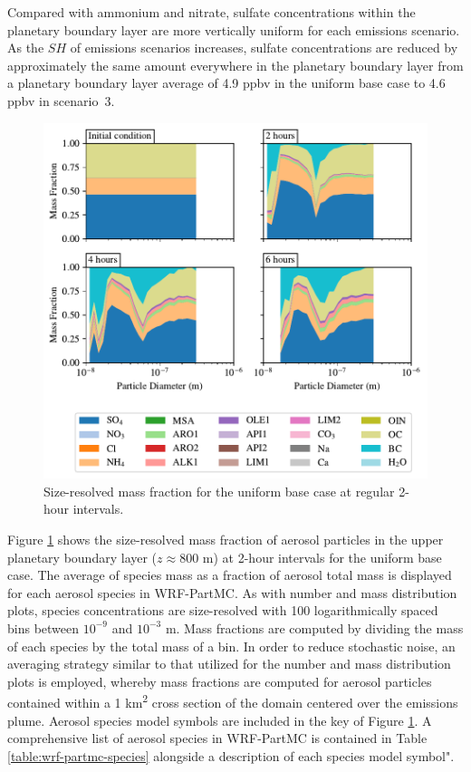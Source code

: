 Compared with ammonium and nitrate, sulfate concentrations within the planetary boundary layer are more vertically uniform for each emissions scenario. As the $SH$ of emissions scenarios increases, sulfate concentrations are reduced by approximately the same amount everywhere in the planetary boundary layer from a planetary boundary layer average of 4.9 ppbv in the uniform base case to 4.6 ppbv in scenario~3. 

\begin{figure}[!t]
  \centering
    \includegraphics[width=\textwidth]{figures/chapter5/speciated-mass-frac-four-panel-uniform-basecase-z40.pdf}
    \caption{Size-resolved mass fraction for the uniform base case at regular 2-hour intervals.}
    \label{fig:mass-frac-ub}
\end{figure}

Figure \ref{fig:mass-frac-ub} shows the size-resolved mass fraction of aerosol particles in the upper planetary boundary layer ($z\approx800$ m) at 2-hour intervals for the uniform base case. The average of species mass as a fraction of aerosol total mass is displayed for each aerosol species in WRF-PartMC. As with number and mass distribution plots, species concentrations are size-resolved with 100 logarithmically spaced bins between $10^{-9}$ and $10^{-3}$ m. Mass fractions are computed by dividing the mass of each species by the total mass of a bin. In order to reduce stochastic noise, an averaging strategy similar to that utilized for the number and mass distribution plots is employed, whereby mass fractions are computed for aerosol particles contained within a 1 \si{km^2} cross section of the domain centered over the emissions plume. Aerosol species model symbols are included in the key of Figure \ref{fig:mass-frac-ub}. A comprehensive list of aerosol species in WRF-PartMC is contained in Table \ref{table:wrf-partmc-species} alongside a description of each species model symbol". 

